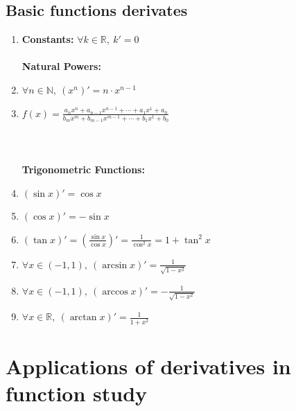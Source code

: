 \documentclass[a4paper]{report}
\begin{document}
\subsection{\textbf{Basic functions derivates}}
\begin{tcolorbox}
\begin{enumerate}
    \item \textbf{Constants: } $\forall k \in \mathbb{R},\ k' = 0$\\\\
    \textbf{Natural Powers: } 
    \item $\forall n \in \mathbb{N},\ \left ( x^{n} \right )' = n \cdot x^{n-1}$
    \item $f\left ( x \right )=\frac{a_{n}x^{n} + a_{n-1}x^{n-1} + \cdots + a_{1}x^{1} + a_{0}}{b_{m}x^{m} + b_{m-1}x^{m-1} + \cdots + b_{1}x^{1} + b_{0}}$ \\ \\
    \\\\
    \textbf{Trigonometric Functions: }
    \item $\left ( \sin x \right )' = \cos x $
    \item $\left ( \cos x \right )' = - \sin x $
    \item $\left ( \tan x \right )' = \left ( \frac{\sin x}{\cos x} \right )' = \frac{1}{\cos ^ {2}x} = 1 + \tan ^{2}x$
    \item $\forall x \in \left ( -1,1 \right ),\ \left ( \arcsin x \right )' = \frac{1}{\sqrt{1-x^{2}}}$
    \item $\forall x \in \left ( -1,1 \right ),\ \left ( \arccos x \right )' =- \frac{1}{\sqrt{1-x^{2}}}$
    \item $\forall x \in \mathbb{R},\ \left ( \arctan x \right )' = \frac{1}{1+x^{2}}$
\end{enumerate}
\end{tcolorbox}
\section{Applications of derivatives in function study}
\end{document}

